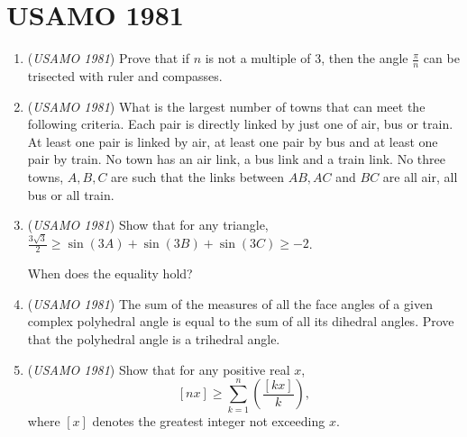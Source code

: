 \section{USAMO 1981}
        \begin{enumerate}
        	\item (\textit{USAMO 1981}) Prove that if $n$ is not a multiple of $3$, then the angle $\frac{\pi}{n}$ can be trisected with ruler and compasses. 


 

	\item (\textit{USAMO 1981}) What is the largest number of towns that can meet the following criteria. Each pair is directly linked by just one of air, bus or train. At least one pair is linked by air, at least one pair by bus and at least one pair by train. No town has an air link, a bus link and a train link. No three towns, $A, B, C$ are such that the links between $AB, AC$ and $BC$ are all air, all bus or all train.


 

	\item (\textit{USAMO 1981}) Show that for any triangle, $\frac{3\sqrt{3}}{2}\ge \sin(3A) + \sin(3B) + \sin (3C) \ge -2$. 


 When does the equality hold?


 

	\item (\textit{USAMO 1981}) The sum of the measures of all the face angles of a given complex polyhedral angle is equal to the sum of all its dihedral angles. Prove that the polyhedral angle is a trihedral angle.


 

	\item (\textit{USAMO 1981}) Show that for any positive real $x$, 
 \[[nx]\ge \sum_{k=1}^{n}\left(\frac{[kx]}{k}\right),\]
where $[x]$ denotes the greatest integer not exceeding $x$.


 

\end{enumerate}